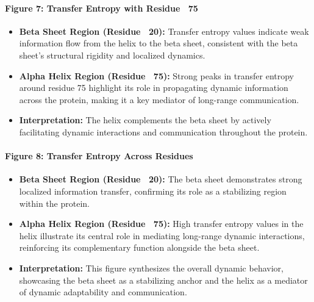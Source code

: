 \documentclass[English, Lau, oneside]{sapthesis}
\begin{document}
\paragraph{Figure 7: Transfer Entropy with Residue ~75}
\begin{itemize}
    \item \textbf{Beta Sheet Region (Residue ~20):} Transfer entropy values indicate weak information flow from the helix to the beta sheet, consistent with the beta sheet's structural rigidity and localized dynamics.
    \item \textbf{Alpha Helix Region (Residue ~75):} Strong peaks in transfer entropy around residue 75 highlight its role in propagating dynamic information across the protein, making it a key mediator of long-range communication.
    \item \textbf{Interpretation:} The helix complements the beta sheet by actively facilitating dynamic interactions and communication throughout the protein.
\end{itemize}

\paragraph{Figure 8: Transfer Entropy Across Residues}
\begin{itemize}
    \item \textbf{Beta Sheet Region (Residue ~20):} The beta sheet demonstrates strong localized information transfer, confirming its role as a stabilizing region within the protein.
    \item \textbf{Alpha Helix Region (Residue ~75):} High transfer entropy values in the helix illustrate its central role in mediating long-range dynamic interactions, reinforcing its complementary function alongside the beta sheet.
    \item \textbf{Interpretation:} This figure synthesizes the overall dynamic behavior, showcasing the beta sheet as a stabilizing anchor and the helix as a mediator of dynamic adaptability and communication.
\end{itemize}
\newpage
\end{document}

